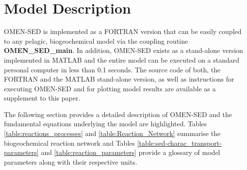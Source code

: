 \documentclass[gmd, manuscript]{copernicus}
\begin{document}


\section{Model Description}\label{sec:model_description}
OMEN-SED is implemented as a FORTRAN version that can be easily coupled to any pelagic, biogeochemical model via the coupling routine \textsf{\textbf{OMEN\_SED\_main}}. 
In addition, OMEN-SED exists as a stand-alone version implemented in MATLAB and the entire model can be executed on a standard personal computer in less than 0.1 seconds. 
The source code of both, the FORTRAN and the MATLAB stand-alone version, as well as instructions for executing OMEN-SED and for plotting model results are available as a supplement to this paper.

The following section provides a detailed description of OMEN-SED and the fundamental equations underlying the model are highlighted. 
Tables \ref{table:reactions_processes} and \ref{table:Reaction_Network} summarise the biogeochemical reaction network and Tables \ref{table:sed-charac_transport-parameters} 
and \ref{table:reaction_parameters} provide a glossary of model parameters along with their respective units. 
\end{document}
